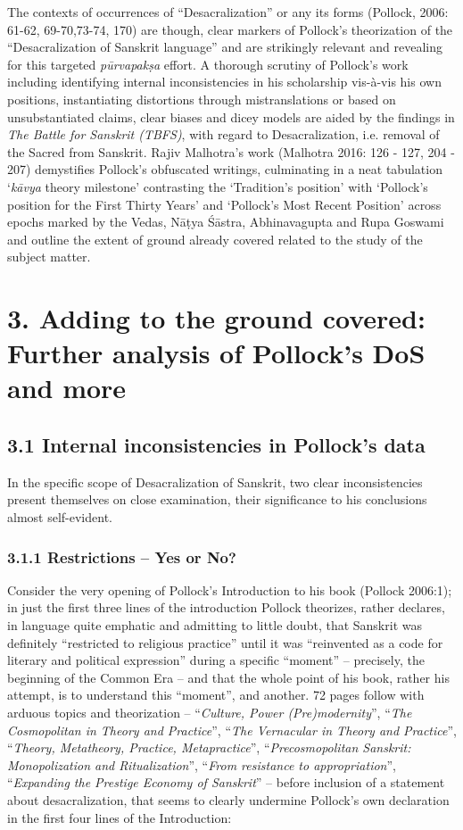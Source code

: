 The contexts of occurrences of “Desacralization” or any its forms (Pollock, 2006: 61-62, 69-70,73-74, 170) are though, clear markers of Pollock’s theorization of the “Desacralization of Sanskrit language” and are strikingly relevant and revealing for this targeted \textit{pūrvapakṣa} effort. A thorough scrutiny of Pollock’s work including identifying internal inconsistencies in his scholarship vis-à-vis his own positions, instantiating distortions through mistranslations or based on unsubstantiated claims, clear biases and dicey models are aided by the findings in \textit{The Battle for Sanskrit (TBFS)}, with regard to Desacralization, i.e. removal of the Sacred from Sanskrit. Rajiv Malhotra’s work (Malhotra 2016: 126 - 127, 204 - 207) demystifies Pollock’s obfuscated writings, culminating in a neat tabulation ‘\textit{kāvya} theory milestone’ contrasting the ‘Tradition’s position’ with ‘Pollock’s position for the First Thirty Years’ and ‘Pollock’s Most Recent Position’ across epochs marked by the Vedas, Nāṭya Śāstra, Abhinavagupta and Rupa Goswami and outline the extent of ground already covered related to the study of the subject matter.


\section*{3. Adding to the ground covered: Further analysis of Pollock’s DoS and more}

\subsection*{3.1 Internal inconsistencies in Pollock’s data}

In the specific scope of Desacralization of Sanskrit, two clear inconsistencies present themselves on close examination, their significance to his conclusions almost self-evident.

\subsubsection*{3.1.1 Restrictions – Yes or No?}

Consider the very opening of Pollock’s Introduction to his book (Pollock 2006:1); in just the first three lines of the introduction Pollock theorizes, rather declares, in language quite emphatic and admitting to little doubt, that Sanskrit was definitely “restricted to religious practice” until it was “reinvented as a code for literary and political expression” during a specific “moment” – precisely, the beginning of the Common Era – and that the whole point of his book, rather his attempt, is to understand this “moment”, and another. 72 pages follow with arduous topics and theorization – “\textit{Culture, Power (Pre)modernity}”, “\textit{The Cosmopolitan in Theory and Practice}”, “\textit{The Vernacular in Theory and Practice}”, “\textit{Theory, Metatheory, Practice, Metapractice}”, “\textit{Precosmopolitan Sanskrit: Monopolization and Ritualization}”, “\textit{From resistance to appropriation}”, “\textit{Expanding the Prestige Economy of Sanskrit}” – before inclusion of a statement about desacralization, that seems to clearly undermine Pollock’s own declaration in the first four lines of the Introduction:

